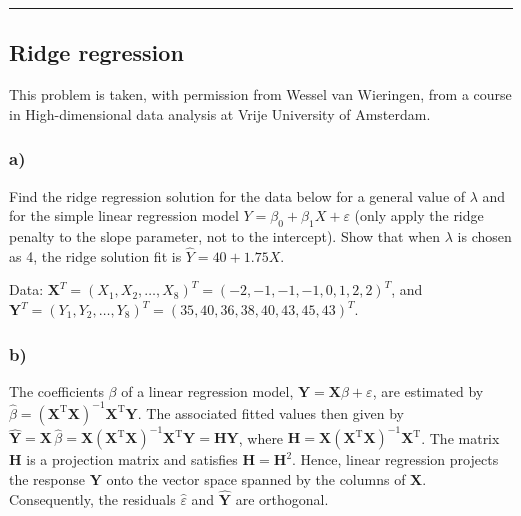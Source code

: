 \documentclass[
  letterpaper,
  DIV=11,
  numbers=noendperiod]{scrartcl}
\begin{document}
\begin{center}\rule{0.5\linewidth}{0.5pt}\end{center}

\hypertarget{ridge-regression-1}{%
\subsection{Ridge regression}\label{ridge-regression-1}}

This problem is taken, with permission from Wessel van Wieringen, from a
course in High-dimensional data analysis at Vrije University of
Amsterdam.

\hypertarget{a}{%
\subsubsection{a)}\label{a}}

Find the ridge regression solution for the data below for a general
value of \(\lambda\) and for the simple linear regression model
\(Y = \beta_0 + \beta_1 X + \varepsilon\) (only apply the ridge penalty
to the slope parameter, not to the intercept). Show that when
\(\lambda\) is chosen as 4, the ridge solution fit is
\(\hat{Y} = 40 + 1.75 X\).

Data:
\(\mathbf{X}^T = (X_1, X_2, \ldots, X_{8})^T = (-2, -1, -1, -1, 0, 1, 2, 2)^T\),
and
\(\mathbf{Y}^T = (Y_1, Y_2, \ldots, Y_{8})^T = (35, 40, 36, 38, 40, 43, 45, 43)^T\).

\hypertarget{b}{%
\subsubsection{b)}\label{b}}

The coefficients \(\beta\) of a linear regression model,
\(\mathbf{Y} = \mathbf{X} \beta + \varepsilon\), are estimated by
\(\hat{\beta} = (\mathbf{X}^\mathrm{T} \mathbf{X})^{-1} \mathbf{X}^\mathrm{T} \mathbf{Y}\).
The associated fitted values then given by
\(\hat{\mathbf{Y}} = \mathbf{X} \, \hat{\beta} = \mathbf{X} (\mathbf{X}^\mathrm{T} \mathbf{X})^{-1} \mathbf{X}^\mathrm{T} \mathbf{Y} = \mathbf{H} \mathbf{Y}\),
where
\(\mathbf{H} = \mathbf{X} (\mathbf{X}^\mathrm{T} \mathbf{X})^{-1} \mathbf{X}^\mathrm{T}\).
The matrix \(\mathbf{H}\) is a projection matrix and satisfies
\(\mathbf{H} = \mathbf{H}^ 2\). Hence, linear regression projects the
response \(\mathbf{Y}\) onto the vector space spanned by the columns of
\(\mathbf{X}\). Consequently, the residuals \(\hat{\varepsilon}\) and
\(\hat{\mathbf{Y}}\) are orthogonal.
\end{document}
